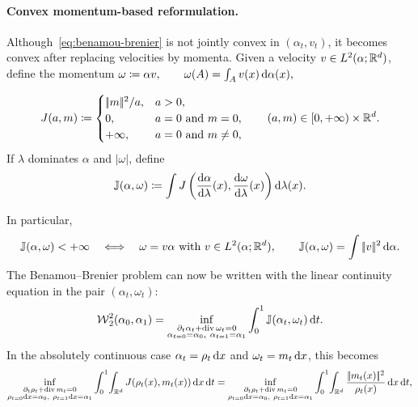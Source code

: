 \paragraph{Convex momentum-based reformulation.}
Although~\eqref{eq:benamou-brenier} is not jointly convex in $(\alpha_t,v_t)$, it becomes convex after replacing velocities by momenta. Given a velocity \(v\in L^2(\alpha;\mathbb{R}^d)\), define the momentum
\(\omega\coloneqq \alpha v, \qquad \omega(A)=\int_A v(x)\,\mathrm{d}\alpha(x),\)
\begin{defn}\label{def-quadratic-perspective-action}
\begin{equation}\label{eq-quadratic-perspective}
J(a,m)
\coloneqq
\begin{cases}
|\!| m |\!|^2/a, & a>0,\\
0, & a=0\ \text{and}\ m=0,\\
+\infty, & a=0\ \text{and}\ m\neq0,
\end{cases}
\qquad
(a,m)\in[0,+\infty)\times\mathbb{R}^d.
\end{equation}
If \(\lambda\) dominates \(\alpha\) and \(|\omega|\), define
\begin{equation}\label{eq-measure-perspective-action}
\mathbb J(\alpha,\omega)
\coloneqq
\int
J\left(
\frac{\mathrm{d}\alpha}{\mathrm{d}\lambda}(x),
\frac{\mathrm{d} \omega}{\mathrm{d}\lambda}(x)
\right)\mathrm{d}\lambda(x).
\end{equation}
\end{defn}
In particular,
\[
\mathbb J(\alpha,\omega)<+\infty
\quad\Longleftrightarrow\quad
\omega=v\alpha\ \text{with}\ v\in L^2(\alpha;\mathbb{R}^d),
\qquad
\mathbb J(\alpha,\omega)=\int|\!| v |\!|^2\,\mathrm{d}\alpha.
\]
The Benamou--Brenier problem can now be written with the linear continuity equation in the pair \((\alpha_t,\omega_t)\):
\begin{equation}\label{eq:benamou-brenier-convex}
\operatorname{\mathcal{W}}_2^2(\alpha_0,\alpha_1)
=
\inf_{\substack{\partial_t\alpha_t+\operatorname{div} \omega_t=0\\
\alpha_{t=0}=\alpha_0,\ \alpha_{t=1}=\alpha_1}}
\int_0^1 \mathbb J(\alpha_t,\omega_t)\,\mathrm{d} t.
\end{equation}
In the absolutely continuous case \(\alpha_t=\rho_t\,\mathrm{d} x\) and \(\omega_t=m_t\,\mathrm{d} x\), this becomes
\[
\inf_{\substack{\partial_t\rho_t+\operatorname{div} m_t=0\\
\rho_{t=0}\mathrm{d} x=\alpha_0,\ \rho_{t=1}\mathrm{d} x=\alpha_1}}
\int_0^1\!\int_{\mathbb{R}^d}
J(\rho_t(x),m_t(x))\,\mathrm{d} x\,\mathrm{d} t
=
\inf_{\substack{\partial_t\rho_t+\operatorname{div} m_t=0\\
\rho_{t=0}\mathrm{d} x=\alpha_0,\ \rho_{t=1}\mathrm{d} x=\alpha_1}}
\int_0^1\!\int_{\mathbb{R}^d}
\frac{|\!| m_t(x) |\!|^2}{\rho_t(x)}\,\mathrm{d} x\,\mathrm{d} t,
\]

